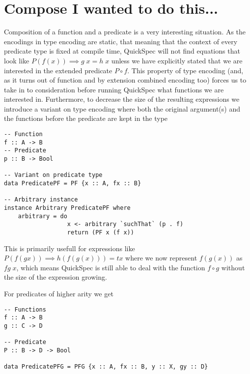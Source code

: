 \section{Compose I wanted to do this...}
Composition of a function and a predicate
is a very interesting situation. As the
encodings in type encoding are static, that meaning
that the context of every predicate type is fixed
at compile time, QuickSpec will not find equations
that look like $P(f(x))\implies g\;x=h\;x$
unless we have explicitly stated that we are interested
in the extended predicate $P \circ f$. This property of type encoding
(and, as it turns out of function and by extension combined encoding too)
forces us to take in to consideration before running QuickSpec
what functions we are interested in. 
Furthermore, to decrease the size of the resulting expressions we introduce
a variant on type encoding where both the original argument(s) and the
functions before the predicate are kept in the type
\begin{verbatim}
-- Function
f :: A -> B
-- Predicate
p :: B -> Bool

-- Variant on predicate type
data PredicatePF = PF {x :: A, fx :: B}

-- Arbitrary instance
instance Arbitrary PredicatePF where
    arbitrary = do
                  x <- arbitrary `suchThat` (p . f)
                  return (PF x (f x))

\end{verbatim}
This is primarily usefull for expressions like $P (f (g x))\implies h(f(g(x))) = t x$
where we now represent $f(g(x))$ as $fg\;x$, which means QuickSpec is still able to
deal with the function $f\circ g$ without the size of the expression growing.

For predicates of higher arity we get
\begin{verbatim}
-- Functions
f :: A -> B
g :: C -> D

-- Predicate
P :: B -> D -> Bool

data PredicatePFG = PFG {x :: A, fx :: B, y :: X, gy :: D}
\end{verbatim}

